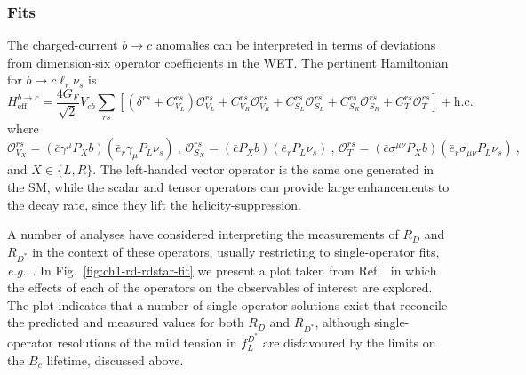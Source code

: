 \subsubsection{Fits}

The charged-current $b \to c$ anomalies can be interpreted in terms of
deviations from dimension-six operator coefficients in the WET. The pertinent
Hamiltonian for $b \to c \ell_{r} \nu_{s}$ is
\begin{equation}
  \label{eq:ch1-bctaunu-ham}
  H^{b\to c}_{\text{eff}} = \frac{4 G_{F}}{\sqrt{2}} V_{cb} \sum_{rs} [(\delta^{rs} + C^{rs}_{V_{L}}) \mathcal{O}^{rs}_{V_{L}} + C_{V_{R}}^{rs} \mathcal{O}^{rs}_{V_{R}} + C^{rs}_{S_{L}}\mathcal{O}^{rs}_{S_{L}} + C^{rs}_{S_{R}}\mathcal{O}^{rs}_{S_{R}} + C^{rs}_{T}\mathcal{O}^{rs}_{T}] + \text{h.c.}
\end{equation}
where
\begin{equation}
  \label{eq:ch1-rdrdstar-ops}
    \mathcal{O}^{rs}_{V_{X}} = (\bar{c} \gamma^{\mu} P_{X} b) (\bar{e}_{r} \gamma_{\mu} P_{L} \nu_{s}) \ , \, \mathcal{O}^{rs}_{S_{X}} = (\bar{c} P_{X} b) (\bar{e}_{r} P_{L} \nu_{s}) \ , \, \mathcal{O}^{rs}_{T} = (\bar{c} \sigma^{\mu\nu} P_{X} b) (\bar{e}_{r} \sigma_{\mu\nu} P_{L} \nu_{s}) \ ,
\end{equation}
and $X \in \{L, R\}$. The left-handed vector operator is the same one generated
in the SM, while the scalar and tensor operators can provide large enhancements
to the decay rate, since they lift the helicity-suppression.

A number of analyses have considered interpreting the measurements of $R_{D}$
and $R_{D^{*}}$ in the context of these operators, usually restricting to
single-operator fits, \textit{e.g.}~\cite{Sakaki:2013bfa, Freytsis:2015qca,
  Jung:2018lfu, Azatov:2018knx, Angelescu:2018tyl, Huang:2018nnq,
  Murgui:2019czp}. In Fig.~\ref{fig:ch1-rd-rdstar-fit} we present a plot taken from
Ref.~\cite{Murgui:2019czp} in which the effects of each of the operators on the
observables of interest are explored. The plot indicates that a number of
single-operator solutions exist that reconcile the predicted and measured values
for both $R_{D}$ and $R_{D^{*}}$, although single-operator resolutions of the
mild tension in $f_{L}^{D^{*}}$ are disfavoured by the limits on the $B_{c}$
lifetime, discussed above.

